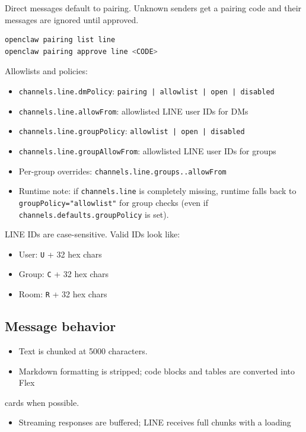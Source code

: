 Direct messages default to pairing. Unknown senders get a pairing code and their
messages are ignored until approved.

\begin{lstlisting}[language=bash]
openclaw pairing list line
openclaw pairing approve line <CODE>
\end{lstlisting}


Allowlists and policies:

\begin{itemize}
  \item \texttt{channels.line.dmPolicy}: \texttt{pairing | allowlist | open | disabled}
  \item \texttt{channels.line.allowFrom}: allowlisted LINE user IDs for DMs
  \item \texttt{channels.line.groupPolicy}: \texttt{allowlist | open | disabled}
  \item \texttt{channels.line.groupAllowFrom}: allowlisted LINE user IDs for groups
  \item Per-group overrides: \texttt{channels.line.groups..allowFrom}
  \item Runtime note: if \texttt{channels.line} is completely missing, runtime falls back to \texttt{groupPolicy="allowlist"} for group checks (even if \texttt{channels.defaults.groupPolicy} is set).
\end{itemize}


LINE IDs are case-sensitive. Valid IDs look like:

\begin{itemize}
  \item User: \texttt{U} + 32 hex chars
  \item Group: \texttt{C} + 32 hex chars
  \item Room: \texttt{R} + 32 hex chars
\end{itemize}


\subsection{Message behavior}


\begin{itemize}
  \item Text is chunked at 5000 characters.
  \item Markdown formatting is stripped; code blocks and tables are converted into Flex
\end{itemize}

cards when possible.
\begin{itemize}
  \item Streaming responses are buffered; LINE receives full chunks with a loading
\end{itemize}

